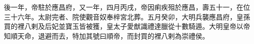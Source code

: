 \begin{pinyinscope}
 後一年，帝駐於應昌府，又一年，四月丙戌，帝因痢疾殂於應昌，壽五十一，在位三十六年。太尉完者、院使觀音奴奉梓宮北葬。五月癸卯，大明兵襲應昌府，皇孫買的裡八剌及后妃並寶玉皆被獲，皇太子愛猷識禮達臘從十數騎遁。大明皇帝以帝知順天命，退避而去，特加其號曰順帝，而封買的裡八剌為崇禮侯。



\end{pinyinscope}